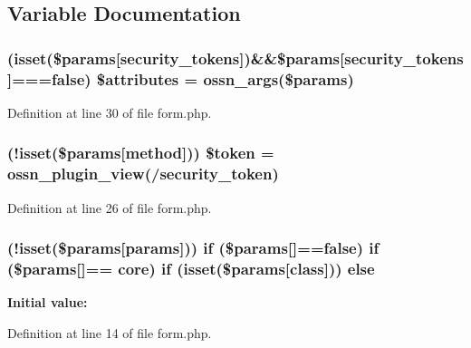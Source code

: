 \subsection{Variable Documentation}
\subsubsection[{\texorpdfstring{\$attributes}{$attributes}}]{ (isset(\$params\mbox{[}\textquotesingle{}security\+\_\+tokens\textquotesingle{}\mbox{]})\&\&\$params\mbox{[}\textquotesingle{}security\+\_\+tokens\textquotesingle{}\mbox{]}===false) \$attributes = {\bf ossn\+\_\+args}(\$params)}\hypertarget{form_8php_a01f7286089be6e856e72206f4e7c619d}{}\label{form_8php_a01f7286089be6e856e72206f4e7c619d}


Definition at line 30 of file form.\+php.

\subsubsection[{\texorpdfstring{\$token}{$token}}]{ (!isset(\$params\mbox{[}\textquotesingle{}method\textquotesingle{}\mbox{]})) \$token = {\bf ossn\+\_\+plugin\+\_\+view}(/security\+\_\+token\textquotesingle{})}\hypertarget{form_8php_a146c054d862f83f17814a8cb71610f56}{}\label{form_8php_a146c054d862f83f17814a8cb71610f56}


Definition at line 26 of file form.\+php.

\subsubsection[{\texorpdfstring{else}{else}}]{ (!isset(\$params\mbox{[}\textquotesingle{}params\textquotesingle{}\mbox{]})) {\bf if} (\$params\mbox{[}\textquotesingle{}\mbox{]}==false) {\bf if} (\$params\mbox{[}\textquotesingle{}\mbox{]}== \textquotesingle{}core\textquotesingle{}) {\bf if} (isset(\$params\mbox{[}\textquotesingle{}class\textquotesingle{}\mbox{]})) else}\hypertarget{form_8php_a9655f79c6c68c05eece5f6e3d1b3df9b}{}\label{form_8php_a9655f79c6c68c05eece5f6e3d1b3df9b}
{\bfseries Initial value\+:}


Definition at line 14 of file form.\+php.


